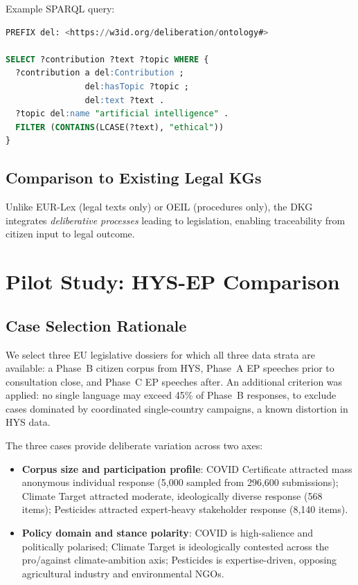\documentclass[sigconf,natbib]{acmart}
\begin{document}
Example SPARQL query:
\begin{lstlisting}[language=SQL, basicstyle=\small\ttfamily]
PREFIX del: <https://w3id.org/deliberation/ontology#>

SELECT ?contribution ?text ?topic WHERE {
  ?contribution a del:Contribution ;
                del:hasTopic ?topic ;
                del:text ?text .
  ?topic del:name "artificial intelligence" .
  FILTER (CONTAINS(LCASE(?text), "ethical"))
}
\end{lstlisting}

\subsection{Comparison to Existing Legal KGs}
Unlike EUR-Lex (legal texts only) or OEIL (procedures only), the DKG integrates \textit{deliberative processes} leading to legislation, enabling traceability from citizen input to legal outcome.

\section{Pilot Study: HYS-EP Comparison}

\subsection{Case Selection Rationale}

We select three EU legislative dossiers for which all three data strata are available:
a Phase~B citizen corpus from HYS, Phase~A EP speeches prior to consultation close, and
Phase~C EP speeches after. An additional criterion was applied: no single language may exceed
45\% of Phase~B responses, to exclude cases dominated by coordinated single-country campaigns,
a known distortion in HYS data.

The three cases provide deliberate variation across two axes:

\begin{itemize}
  \item \textbf{Corpus size and participation profile}: COVID Certificate attracted mass
        anonymous individual response (5,000 sampled from 296,600 submissions); Climate
        Target attracted moderate, ideologically diverse response (568 items);
        Pesticides attracted expert-heavy stakeholder response (8,140 items).
  \item \textbf{Policy domain and stance polarity}: COVID is high-salience and politically
        polarised; Climate Target is ideologically contested across the pro/against
        climate-ambition axis; Pesticides is expertise-driven, opposing agricultural
        industry and environmental NGOs.
\end{itemize}
\end{document}
